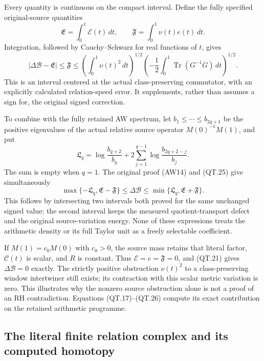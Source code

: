 Every quantity is continuous on the compact interval. Define the
fully specified original-source quantities
\[
 \mathfrak E=\int_0^1\mathcal E(t)\,dt,\qquad
 \mathfrak F=\int_0^1\nu(t)e(t)\,dt.
 \]
Integration, followed by Cauchy--Schwarz for real functions of \(t\),
gives
\[
 \boxed{\quad
 |\Delta\mathcal B-\mathfrak E|\le\mathfrak F
 \le
 \left(\int_0^1\nu(t)^2\,dt\right)^{1/2}
 \left(-\frac12\int_0^1\operatorname{Tr}(G^{-1}\ddot G)\,dt\right)^{1/2}.
 \quad}
 \tag{QT.25}\label{eq:qt-globalbound}
\]
This is an interval centered at the actual class-preserving
commutator, with an explicitly calculated relation-speed error.
It supplements, rather than assumes a sign for, the original
signed correction.

To combine with the fully retained AW spectrum, let
\(b_1\le\cdots\le b_{2q+1}\) be the positive eigenvalues of the actual
relative source operator \(M(0)^{-1}M(1)\), and put
\[
 \mathfrak L_q=
 \log\frac{b_{q+2}}{b_q}
       +2\sum_{j=1}^{q-1}\log\frac{b_{2q+2-j}}{b_j}.
 \]
The sum is empty when \(q=1\).
The original proof (AW14) and (QT.25) give simultaneously
\[
 \boxed{\quad
 \max\{-\mathfrak L_q,\mathfrak E-\mathfrak F\}
 \le\Delta\mathcal B\le
 \min\{\mathfrak L_q,\mathfrak E+\mathfrak F\}.
 \quad}
 \tag{QT.26}\label{eq:qt-intersection}
\]
This follows by intersecting two intervals both proved for the same
unchanged signed value; the second interval keeps the measured
quotient-transport defect and the original source-variation energy.
None of these expressions treats the arithmetic density or its full
Taylor unit as a freely selectable coefficient.

If \(M(1)=c_0M(0)\) with \(c_0>0\), the source mass retains that
literal factor, \(\mathcal C(t)\) is scalar, and \(R\) is constant.
Thus \(\mathcal E=e=\mathfrak F=0\), and (QT.21) gives
\(\Delta\mathcal B=0\) exactly. The strictly positive obstruction
\(\nu(t)^2\) to a class-preserving window intertwiner still exists;
its contraction with this scalar metric variation is zero.
This illustrates why the nonzero source obstruction alone is not
a proof of an RH contradiction. Equations (QT.17)--(QT.26) compute
its exact contribution on the retained arithmetic programme.

\subsection{The literal finite relation complex and its computed homotopy}


